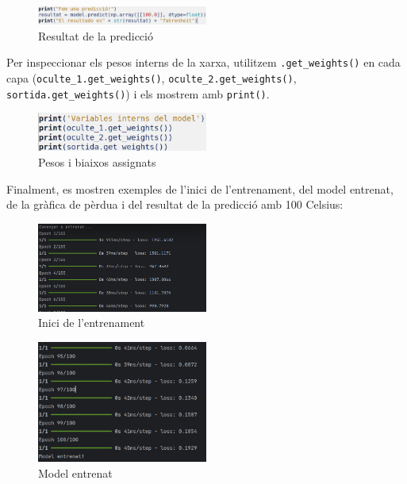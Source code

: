 \begin{figure}[H]
\centering
\includegraphics[width=0.5\textwidth]{./figures/8.png}
\caption{Resultat de la predicció}
\end{figure}

Per inspeccionar els pesos interns de la xarxa, utilitzem \texttt{.get\_weights()} en cada capa (\texttt{oculte\_1.get\_weights()}, \texttt{oculte\_2.get\_weights()}, \texttt{sortida.get\_weights()}) i els mostrem amb \texttt{print()}.

\begin{figure}[H]
\centering
\includegraphics[width=0.5\textwidth]{./figures/9.png}
\caption{Pesos i biaixos assignats}
\end{figure}

Finalment, es mostren exemples de l’inici de l’entrenament, del model entrenat, de la gràfica de pèrdua i del resultat de la predicció amb 100 Celsius:

\begin{figure}[H]
\centering
\includegraphics[width=0.5\textwidth]{./figures/10.png}
\caption{Inici de l’entrenament}
\end{figure}

\begin{figure}[H]
\centering
\includegraphics[width=0.5\textwidth]{./figures/11.png}
\caption{Model entrenat}
\end{figure}

